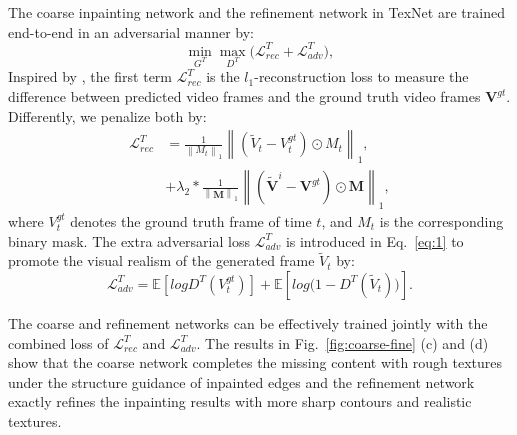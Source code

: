 The coarse inpainting network and the refinement network in TexNet are trained end-to-end in an adversarial manner by:
%
\begin{equation}
	\label{eq:1}
	\min\limits_{G^T} \max \limits_{D^T} \big(\mathcal{L}^{T}_{rec}+\mathcal{L}^T_{adv}\big),
\end{equation}
%
Inspired by \cite{nazeri2019edgeconnect}, the first term $\mathcal{L}^{T}_{rec}$ is the $l_1$-reconstruction loss to measure the difference between predicted video frames and the ground truth video frames $\boldsymbol{V}^{gt}$.
Differently, we penalize both  by:
\begin{equation}
		\label{eq:loss_rec}
	\begin{aligned}
		\mathcal{L}^{T}_{rec}&=\frac{1}{\left\|M_t \right\|_1}\left\|(\widetilde{V}_t-V^{gt}_t)\odot M_t\right\|_1,\\ 
		&+\lambda_2*\frac{1}{\left\|\boldsymbol{M} \right\|_1}\left\|(\boldsymbol{\widetilde{V}}^i-\boldsymbol{V}^{gt})\odot \boldsymbol{M}\right\|_1,
	\end{aligned}
\end{equation}
where $V^{gt}_t$ denotes the ground truth frame of time $t$, and $M_t$ is the corresponding binary mask. 
%
The extra adversarial loss $\mathcal{L}^T_{adv}$ is introduced in Eq.~\eqref{eq:1} to promote the visual realism of the generated frame $\widetilde{V}_t$ by:
	\begin{equation}
		\label{eq:inp_adver}
		\mathcal{L}^T_{adv}=\mathbb{E}[logD^T(V^{gt}_t)]+\mathbb{E}[log\big(1-D^T(\widetilde{V}_t)\big)].
	\end{equation}


The coarse and refinement networks can be effectively trained jointly with the combined loss of $\mathcal{L}^T_{rec}$ and $\mathcal{L}^T_{adv}$.
The results in Fig.~\ref{fig:coarse-fine} (c) and (d) show that the coarse network completes the missing content with rough textures under the structure guidance of inpainted edges and the refinement network exactly refines the inpainting results with more sharp contours and realistic textures.



